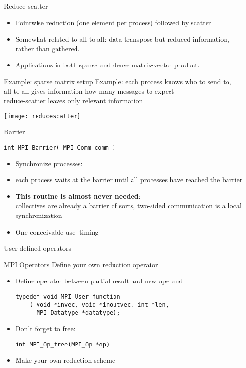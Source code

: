 \begin{numberedframe}{Reduce-scatter}
  \begin{itemize}
  \item 
    Pointwise reduction (one element per process) followed by scatter
  \item 
    Somewhat related to all-to-all: data transpose but reduced
    information, rather than gathered.
  \item Applications in both sparse and dense matrix-vector product.
  \end{itemize}
\end{numberedframe}

\begin{numberedframe}{Example: sparse matrix setup}
  Example: each process knows who to send to, \\
  all-to-all gives information how many messages to expect\\
  reduce-scatter leaves only relevant information

  \texttt{[image: reducescatter]}
\end{numberedframe}

\begin{numberedframe}{Barrier}
\begin{lstlisting}
int MPI_Barrier( MPI_Comm comm )
\end{lstlisting}
  \begin{itemize}
  \item Synchronize processes:
  \item each process waits at the barrier until all processes have reached the barrier
  \item \textbf{This routine is almost never needed}:\\
    collectives are already a barrier of sorts, two-sided
    communication is a local synchronization
  \item One conceivable use: timing
  \end{itemize}
\end{numberedframe}

 {User-defined operators}

\begin{numberedframe}{MPI Operators}
  Define your own reduction operator
  \begin{itemize}
  \item Define operator between partial result and new operand
\lstset{language=C}
\begin{lstlisting}
typedef void MPI_User_function
    ( void *invec, void *inoutvec, int *len, 
      MPI_Datatype *datatype); 
\end{lstlisting}
\item Don't forget to free:
\lstset{language=C}
\begin{lstlisting}
int MPI_Op_free(MPI_Op *op)  
\end{lstlisting}
\item Make your own reduction scheme 
  \end{itemize}
\end{numberedframe}

